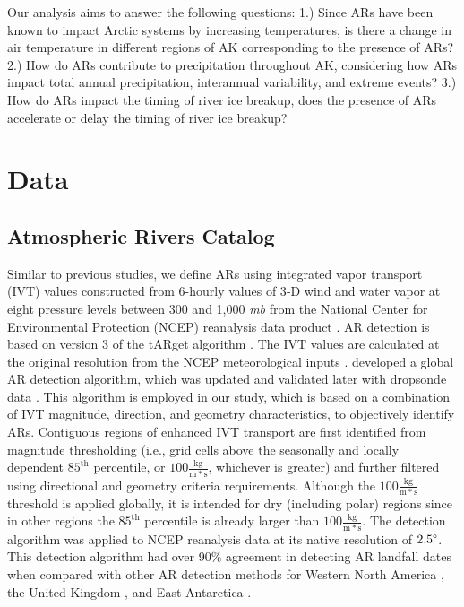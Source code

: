 \documentclass[12pts,draft]{AR_analysis_}
\begin{document}
Our analysis aims to answer the following questions: 
1.) Since ARs have been known to impact Arctic systems by increasing 
temperatures, is there a change in
air temperature in different regions of AK corresponding to the 
presence of ARs?
2.) How do ARs contribute to precipitation throughout AK, 
considering how ARs impact total annual precipitation, interannual 
variability, and extreme events?
3.) How do ARs impact the timing of river ice breakup, does the presence 
of ARs accelerate or delay the timing of river ice breakup?

\section{Data}

\subsection{Atmospheric Rivers Catalog}

Similar to previous studies, we define ARs using integrated vapor
transport (IVT) values constructed from 6-hourly values of 3‐D wind and
water vapor at eight pressure levels between 300 and 1,000
\emph{mb} from the National Center for Environmental Protection (NCEP) 
reanalysis data product \cite{NCEP_NCAR_reanalysis}. 
AR detection is based on version 3 of the tARget algorithm
\cite{Guan_Waliser2019, bin2022}.
The IVT values are calculated at the original
resolution from the NCEP
meteorological inputs \cite{NCEP_reanalysis}.
 developed a global
AR detection algorithm, which was updated and validated later with
dropsonde data \cite{guan2018}. This algorithm is employed in
our study, which is based on a combination of IVT magnitude,
direction, and geometry characteristics, to objectively identify ARs.
Contiguous regions of enhanced IVT transport are first identified from
magnitude thresholding (i.e., grid cells above the seasonally
and locally dependent $85^{\text{th}}$ percentile, or 
$\mathrm{100\frac{kg}{m*s}}$, 
whichever is greater) and further filtered
using directional and geometry criteria requirements. Although the 
$\mathrm{100\frac{kg}{m*s}}$ threshold is applied globally, it is intended for 
dry (including polar) regions since in other regions the $85^{\text{th}}$ percentile 
is already larger than $\mathrm{100\frac{kg}{m*s}}$. The detection
algorithm was applied to NCEP reanalysis data at its native resolution of $2.5 \degree$.
This detection algorithm had over 90\% agreement in detecting AR
landfall dates when compared with other AR detection methods for Western
North America \cite{Neiman2008}, the United Kingdom \cite{Lavers2011}, 
and East Antarctica \cite{Gorodetskaya2014}. 
\end{document}
